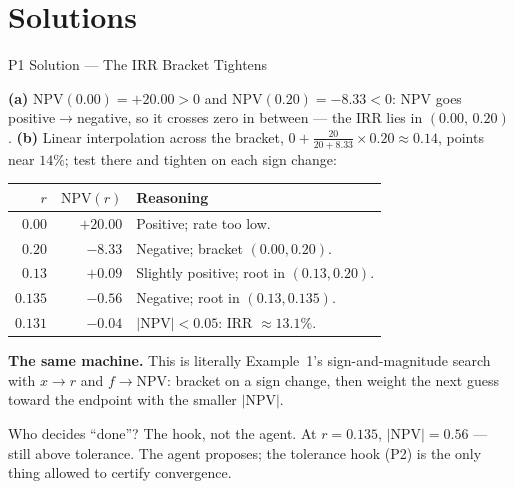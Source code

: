 \documentclass[9pt,t]{beamer}
\begin{document}
\section{Solutions}

\begin{frame}{P1 Solution --- The IRR Bracket Tightens}

\textbf{(a)} $\mathrm{NPV}(0.00)=+20.00>0$ and $\mathrm{NPV}(0.20)=-8.33<0$: NPV
goes positive$\to$negative, so it crosses zero in between --- the IRR lies in
$(0.00,\,0.20)$. \textbf{(b)} Linear interpolation across the bracket,
$0+\tfrac{20}{20+8.33}\times 0.20\approx 0.14$, points near $14\%$; test there
and tighten on each sign change:

\begin{table}
\centering
\begin{tabular}{@{}rrl@{}}
\toprule
$r$ & $\mathrm{NPV}(r)$ & Reasoning \\
\midrule
$0.00$ & $+20.00$ & Positive; rate too low. \\
$0.20$ & $-8.33$ & Negative; bracket $(0.00,0.20)$. \\
$\mathbf{0.13}$ & $\mathbf{+0.09}$ & Slightly positive; root in $(0.13,0.20)$. \\
$\mathbf{0.135}$ & $\mathbf{-0.56}$ & Negative; root in $(0.13,0.135)$. \\
$0.131$ & $-0.04$ & $|\mathrm{NPV}|<0.05$: IRR $\approx 13.1\%$. \\
\bottomrule
\end{tabular}
\end{table}

\smallskip
\textbf{The same machine.} This is literally Example~1's sign-and-magnitude
search with $x\to r$ and $f\to\mathrm{NPV}$: bracket on a sign change, then weight
the next guess toward the endpoint with the smaller $|\mathrm{NPV}|$.

\medskip
\begin{block}{Who decides ``done''?}
\alert{The hook, not the agent.} At $r=0.135$, $|\mathrm{NPV}|=0.56$ --- still
above tolerance. The agent proposes; the tolerance hook (P2) is the only thing
allowed to certify convergence.
\end{block}
\end{frame}
\end{document}

